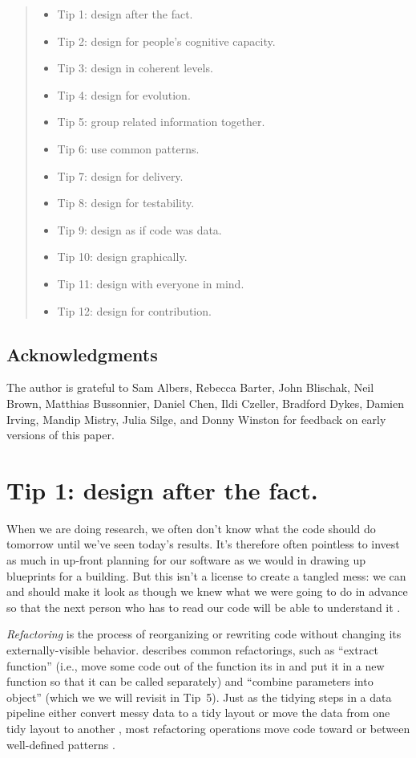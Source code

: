 \documentclass[10pt,letterpaper]{article}
\begin{document}
\begin{quotation}
  \begin{itemize}
    \item Tip 1: design after the fact.
    \item Tip 2: design for people's cognitive capacity.
    \item Tip 3: design in coherent levels.
    \item Tip 4: design for evolution.
    \item Tip 5: group related information together.
    \item Tip 6: use common patterns.
    \item Tip 7: design for delivery.
    \item Tip 8: design for testability.
    \item Tip 9: design as if code was data.
    \item Tip 10: design graphically.
    \item Tip 11: design with everyone in mind.
    \item Tip 12: design for contribution.
  \end{itemize}
\end{quotation}

\subsection*{Acknowledgments}

The author is grateful to Sam Albers,
Rebecca Barter,
John Blischak,
Neil Brown,
Matthias Bussonnier,
Daniel Chen,
Ildi Czeller,
Bradford Dykes,
Damien Irving,
Mandip Mistry,
Julia Silge,
and Donny Winston
for feedback on early versions of this paper.

\section*{Tip 1: design after the fact.}

When we are doing research,
we often don't know what the code should do tomorrow
until we've seen today's results.
It's therefore often pointless to invest as much in up-front planning for our software
as we would in drawing up blueprints for a building.
But this isn't a license to create a tangled mess:
we can and should make it look as though we knew what we were going to do in advance
so that the next person who has to read our code will be able to understand it \cite{Parnas1986}.

\emph{Refactoring} is the process of reorganizing or rewriting code
without changing its externally-visible behavior.
\cite{Fowler2018} describes common refactorings,
such as ``extract function''
(i.e., move some code out of the function its in
and put it in a new function so that it can be called separately)
and ``combine parameters into object''
(which we we will revisit in Tip~5).
Just as the tidying steps in a data pipeline
either convert messy data to a tidy layout or move the data from one tidy layout to another \cite{Wickham2017},
most refactoring operations move code toward or between well-defined patterns \cite{Kerievsky2004}.
\end{document}
